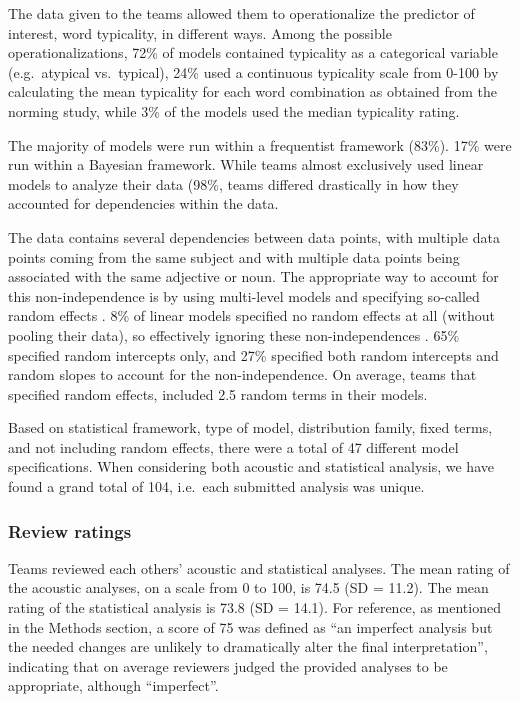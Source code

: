 \documentclass[Review,times,sageh]{sagej}
\begin{document}
The data given to the teams allowed them to operationalize the predictor of interest, word typicality, in different ways.
Among the possible operationalizations, 72\% of models contained typicality as a categorical variable (e.g.~atypical vs.~typical), 24\% used a continuous typicality scale from 0-100 by calculating the mean typicality for each word combination as obtained from the norming study, while 3\% of the models used the median typicality rating.

The majority of models were run within a frequentist framework (83\%).
17\% were run within a Bayesian framework.
While teams almost exclusively used linear models to analyze their data (98\%, teams differed drastically in how they accounted for dependencies within the data.

The data contains several dependencies between data points, with multiple data points coming from the same subject and with multiple data points being associated with the same adjective or noun.
The appropriate way to account for this non-independence is by using multi-level models and specifying so-called random effects \citep[e.g.,][]{gelman2006data, schielzeth2009conclusions}.
8\% of linear models specified no random effects at all (without pooling their data), so effectively ignoring these non-independences \citep{hurlbert1984pseudoreplication}.
65\% specified random intercepts only, and 27\% specified both random intercepts and random slopes to account for the non-independence.
On average, teams that specified random effects, included 2.5 random terms in their models.

Based on statistical framework, type of model, distribution family, fixed terms, and not including random effects, there were a total of 47 different model specifications.
When considering both acoustic and statistical analysis, we have found a grand total of 104, i.e.~each submitted analysis was unique.

\hypertarget{review-ratings}{%
\subsubsection{Review ratings}\label{review-ratings}}

Teams reviewed each others' acoustic and statistical analyses.
The mean rating of the acoustic analyses, on a scale from 0 to 100, is 74.5 (SD = 11.2).
The mean rating of the statistical analysis is 73.8 (SD = 14.1).
For reference, as mentioned in the Methods section, a score of 75 was defined as ``an imperfect analysis but the needed changes are unlikely to dramatically alter the final interpretation'', indicating that on average reviewers judged the provided analyses to be appropriate, although ``imperfect''.
\end{document}
